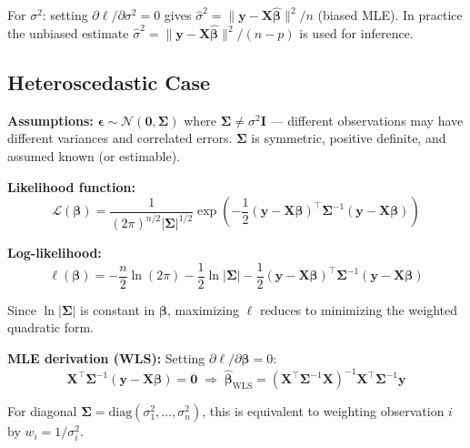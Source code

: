 \documentclass[12pt,a4paper]{article}
\begin{document}
For $\sigma^2$: setting $\partial\ell/\partial\sigma^2 = 0$ gives
$\hat{\sigma}^2 = \|\mathbf{y} - \mathbf{X}\hat{\boldsymbol{\beta}}\|^2/n$ (biased MLE).
In practice the unbiased estimate $\hat{\sigma}^2 = \|\mathbf{y} - \mathbf{X}\hat{\boldsymbol{\beta}}\|^2/(n-p)$
is used for inference.

\subsection{Heteroscedastic Case}

\textbf{Assumptions:}
$\boldsymbol{\epsilon} \sim \mathcal{N}(\mathbf{0}, \boldsymbol{\Sigma})$ where
$\boldsymbol{\Sigma} \neq \sigma^2\mathbf{I}$ --- different observations may have
different variances and correlated errors. $\boldsymbol{\Sigma}$ is symmetric,
positive definite, and assumed known (or estimable).

\textbf{Likelihood function:}
\begin{equation}
    \mathcal{L}(\boldsymbol{\beta}) =
    \frac{1}{(2\pi)^{n/2}|\boldsymbol{\Sigma}|^{1/2}}
    \exp\!\left(-\frac{1}{2}(\mathbf{y} - \mathbf{X}\boldsymbol{\beta})^\top
    \boldsymbol{\Sigma}^{-1}(\mathbf{y} - \mathbf{X}\boldsymbol{\beta})\right)
\end{equation}

\textbf{Log-likelihood:}
\begin{equation}
    \ell(\boldsymbol{\beta})
    = -\frac{n}{2}\ln(2\pi) - \frac{1}{2}\ln|\boldsymbol{\Sigma}|
      - \frac{1}{2}(\mathbf{y} - \mathbf{X}\boldsymbol{\beta})^\top
        \boldsymbol{\Sigma}^{-1}(\mathbf{y} - \mathbf{X}\boldsymbol{\beta})
\end{equation}

Since $\ln|\boldsymbol{\Sigma}|$ is constant in $\boldsymbol{\beta}$, maximizing $\ell$
reduces to minimizing the weighted quadratic form.

\textbf{MLE derivation (WLS):}
Setting $\partial\ell/\partial\boldsymbol{\beta} = 0$:
\begin{equation}
    \mathbf{X}^\top\boldsymbol{\Sigma}^{-1}(\mathbf{y} - \mathbf{X}\boldsymbol{\beta}) = \mathbf{0}
    \;\Rightarrow\;
    \boxed{\hat{\boldsymbol{\beta}}_{\mathrm{WLS}} =
    (\mathbf{X}^\top\boldsymbol{\Sigma}^{-1}\mathbf{X})^{-1}\mathbf{X}^\top\boldsymbol{\Sigma}^{-1}\mathbf{y}}
\end{equation}

For diagonal $\boldsymbol{\Sigma} = \mathrm{diag}(\sigma_1^2,\ldots,\sigma_n^2)$, this
is equivalent to weighting observation $i$ by $w_i = 1/\sigma_i^2$.
\end{document}
